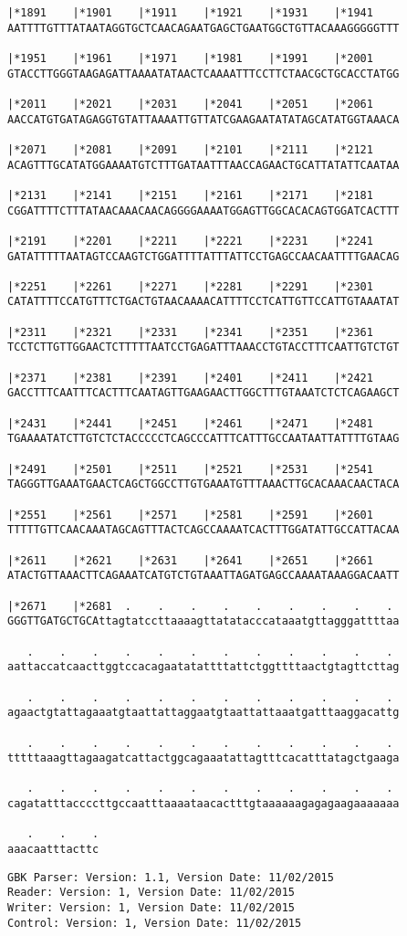 \documentclass{article}
\begin{document}
\begin{Verbatim}
|*1891    |*1901    |*1911    |*1921    |*1931    |*1941    
AATTTTGTTTATAATAGGTGCTCAACAGAATGAGCTGAATGGCTGTTACAAAGGGGGTTT
  
|*1951    |*1961    |*1971    |*1981    |*1991    |*2001    
GTACCTTGGGTAAGAGATTAAAATATAACTCAAAATTTCCTTCTAACGCTGCACCTATGG
  
|*2011    |*2021    |*2031    |*2041    |*2051    |*2061    
AACCATGTGATAGAGGTGTATTAAAATTGTTATCGAAGAATATATAGCATATGGTAAACA
  
|*2071    |*2081    |*2091    |*2101    |*2111    |*2121    
ACAGTTTGCATATGGAAAATGTCTTTGATAATTTAACCAGAACTGCATTATATTCAATAA
  
|*2131    |*2141    |*2151    |*2161    |*2171    |*2181    
CGGATTTTCTTTATAACAAACAACAGGGGAAAATGGAGTTGGCACACAGTGGATCACTTT
  
|*2191    |*2201    |*2211    |*2221    |*2231    |*2241    
GATATTTTTAATAGTCCAAGTCTGGATTTTATTTATTCCTGAGCCAACAATTTTGAACAG
  
|*2251    |*2261    |*2271    |*2281    |*2291    |*2301    
CATATTTTCCATGTTTCTGACTGTAACAAAACATTTTCCTCATTGTTCCATTGTAAATAT
  
|*2311    |*2321    |*2331    |*2341    |*2351    |*2361    
TCCTCTTGTTGGAACTCTTTTTAATCCTGAGATTTAAACCTGTACCTTTCAATTGTCTGT
  
|*2371    |*2381    |*2391    |*2401    |*2411    |*2421    
GACCTTTCAATTTCACTTTCAATAGTTGAAGAACTTGGCTTTGTAAATCTCTCAGAAGCT
  
|*2431    |*2441    |*2451    |*2461    |*2471    |*2481    
TGAAAATATCTTGTCTCTACCCCCTCAGCCCATTTCATTTGCCAATAATTATTTTGTAAG
  
|*2491    |*2501    |*2511    |*2521    |*2531    |*2541    
TAGGGTTGAAATGAACTCAGCTGGCCTTGTGAAATGTTTAAACTTGCACAAACAACTACA
  
|*2551    |*2561    |*2571    |*2581    |*2591    |*2601    
TTTTTGTTCAACAAATAGCAGTTTACTCAGCCAAAATCACTTTGGATATTGCCATTACAA
  
|*2611    |*2621    |*2631    |*2641    |*2651    |*2661    
ATACTGTTAAACTTCAGAAATCATGTCTGTAAATTAGATGAGCCAAAATAAAGGACAATT
  
|*2671    |*2681  .    .    .    .    .    .    .    .    . 
GGGTTGATGCTGCAttagtatccttaaaagttatatacccataaatgttagggattttaa
  
   .    .    .    .    .    .    .    .    .    .    .    . 
aattaccatcaacttggtccacagaatatattttattctggttttaactgtagttcttag
  
   .    .    .    .    .    .    .    .    .    .    .    . 
agaactgtattagaaatgtaattattaggaatgtaattattaaatgatttaaggacattg
  
   .    .    .    .    .    .    .    .    .    .    .    . 
tttttaaagttagaagatcattactggcagaaatattagtttcacatttatagctgaaga
  
   .    .    .    .    .    .    .    .    .    .    .    . 
cagatatttaccccttgccaatttaaaataacactttgtaaaaaagagagaagaaaaaaa
  
   .    .    .
aaacaatttacttc
\end{Verbatim}
\newpage
\begin{Verbatim}
GBK Parser: Version: 1.1, Version Date: 11/02/2015
Reader: Version: 1, Version Date: 11/02/2015
Writer: Version: 1, Version Date: 11/02/2015
Control: Version: 1, Version Date: 11/02/2015
\end{Verbatim}
\end{document}
